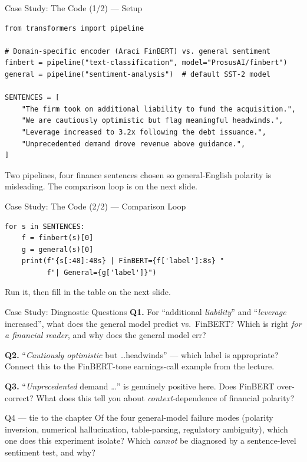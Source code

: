 \documentclass[9pt,t]{beamer}
\begin{document}
\begin{frame}[fragile]{Case Study: The Code (1/2) --- Setup}
\begin{lstlisting}
from transformers import pipeline

# Domain-specific encoder (Araci FinBERT) vs. general sentiment
finbert = pipeline("text-classification", model="ProsusAI/finbert")
general = pipeline("sentiment-analysis")  # default SST-2 model

SENTENCES = [
    "The firm took on additional liability to fund the acquisition.",
    "We are cautiously optimistic but flag meaningful headwinds.",
    "Leverage increased to 3.2x following the debt issuance.",
    "Unprecedented demand drove revenue above guidance.",
]
\end{lstlisting}

\medskip
\footnotesize Two pipelines, four finance sentences chosen so general-English polarity
is misleading. The comparison loop is on the next slide.
\end{frame}

\begin{frame}[fragile]{Case Study: The Code (2/2) --- Comparison Loop}
\begin{lstlisting}
for s in SENTENCES:
    f = finbert(s)[0]
    g = general(s)[0]
    print(f"{s[:48]:48s} | FinBERT={f['label']:8s} "
          f"| General={g['label']}")
\end{lstlisting}

\medskip
\footnotesize Run it, then fill in the table on the next slide.
\end{frame}

\begin{frame}{Case Study: Diagnostic Questions}
\textbf{Q1.} For ``additional \emph{liability}'' and ``\emph{leverage} increased'',
what does the general model predict vs.\ FinBERT? Which is right \emph{for a financial
reader}, and why does the general model err?

\medskip
\textbf{Q2.} ``\emph{Cautiously optimistic} but \dots headwinds'' --- which label is
appropriate? Connect this to the FinBERT-tone earnings-call example from the lecture.

\medskip
\textbf{Q3.} ``\emph{Unprecedented} demand \dots'' is genuinely positive here. Does
FinBERT over-correct? What does this tell you about \emph{context}-dependence of
financial polarity?

\medskip
\begin{block}{Q4 --- tie to the chapter}
Of the four general-model failure modes (polarity inversion, numerical hallucination,
table-parsing, regulatory ambiguity), which one does this experiment isolate? Which
\emph{cannot} be diagnosed by a sentence-level sentiment test, and why?
\end{block}
\end{frame}
\end{document}
